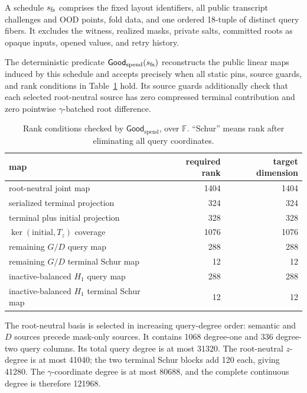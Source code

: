 \begin{definition}
\label{def:spend-schedule}
A \Profile{} schedule \(s_{\rm fs}\) comprises the fixed layout identifiers,
all public transcript challenges and OOD points, fold data, and one ordered
18-tuple of distinct query fibers.  It excludes the witness, realized masks,
private salts, committed roots as opaque inputs, opened values, and retry
history.
\end{definition}

The deterministic predicate \(\mathsf{Good}_{\mathrm{spend}}(s_{\rm fs})\) reconstructs
the public linear maps induced by this schedule and accepts precisely when
all static pins, source guards, and rank conditions in
Table~\ref{tab:goodspend-ranks} hold.  Its source guards additionally check that
each selected root-neutral source has zero compressed terminal contribution
and zero pointwise \(\gamma\)-batched root difference.

\begin{table}[t]
\centering
\caption{Rank conditions checked by \(\mathsf{Good}_{\mathrm{spend}}\), over
\(\mathbb F\).  ``Schur'' means rank after eliminating all query coordinates.}
\label{tab:goodspend-ranks}
\begin{tabular}{@{}lrr@{}}
\toprule
map & required rank & target dimension \\
\midrule
root-neutral joint map & 1404 & 1404 \\
serialized terminal projection & 324 & 324 \\
terminal plus initial projection & 328 & 328 \\
\(\ker(\mathrm{initial},T_z)\) coverage & 1076 & 1076 \\
remaining \(G/D\) query map & 288 & 288 \\
remaining \(G/D\) terminal Schur map & 12 & 12 \\
inactive-balanced \(H_1\) query map & 288 & 288 \\
inactive-balanced \(H_1\) terminal Schur map & 12 & 12 \\
\bottomrule
\end{tabular}
\end{table}

The root-neutral basis is selected in increasing query-degree order:
semantic and \(D\) sources precede mask-only sources.  It contains 1068
degree-one and 336 degree-two query columns.  Its total query degree is at
most 31320.  The root-neutral \(z\)-degree is at most 41040; the two terminal
Schur blocks add 120 each, giving 41280.  The \(\gamma\)-coordinate degree is
at most 80688, and the complete continuous degree is therefore 121968.

